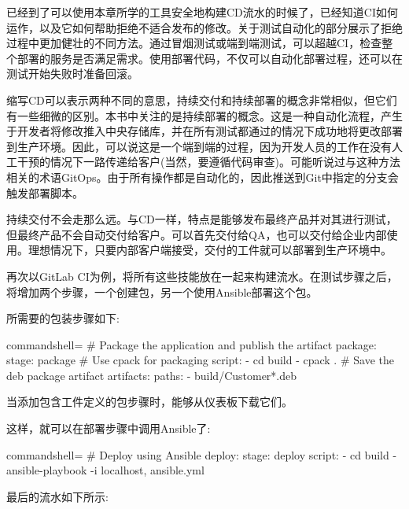 
已经到了可以使用本章所学的工具安全地构建CD流水的时候了，已经知道CI如何运作，以及它如何帮助拒绝不适合发布的修改。关于测试自动化的部分展示了拒绝过程中更加健壮的不同方法。通过冒烟测试或端到端测试，可以超越CI，检查整个部署的服务是否满足需求。使用部署代码，不仅可以自动化部署过程，还可以在测试开始失败时准备回滚。


缩写CD可以表示两种不同的意思，持续交付和持续部署的概念非常相似，但它们有一些细微的区别。本书中关注的是持续部署的概念。这是一种自动化流程，产生于开发者将修改推入中央存储库，并在所有测试都通过的情况下成功地将更改部署到生产环境。因此，可以说这是一个端到端的过程，因为开发人员的工作在没有人工干预的情况下一路传递给客户(当然，要遵循代码审查)。可能听说过与这种方法相关的术语GitOps。由于所有操作都是自动化的，因此推送到Git中指定的分支会触发部署脚本。

持续交付不会走那么远。与CD一样，特点是能够发布最终产品并对其进行测试，但最终产品不会自动交付给客户。可以首先交付给QA，也可以交付给企业内部使用。理想情况下，只要内部客户端接受，交付的工件就可以部署到生产环境中。


再次以GitLab CI为例，将所有这些技能放在一起来构建流水。在测试步骤之后，将增加两个步骤，一个创建包，另一个使用Ansible部署这个包。

所需要的包装步骤如下:

\begin{tcblisting}{commandshell={}}
# Package the application and publish the artifact
package:
  stage: package
  # Use cpack for packaging
  script:
    - cd build
    - cpack .
  # Save the deb package artifact
  artifacts:
    paths:
      - build/Customer*.deb
\end{tcblisting}

当添加包含工件定义的包步骤时，能够从仪表板下载它们。

这样，就可以在部署步骤中调用Ansible了:

\begin{tcblisting}{commandshell={}}
# Deploy using Ansible
deploy:
  stage: deploy
  script:
    - cd build
    - ansible-playbook -i localhost, ansible.yml
\end{tcblisting}

最后的流水如下所示:

